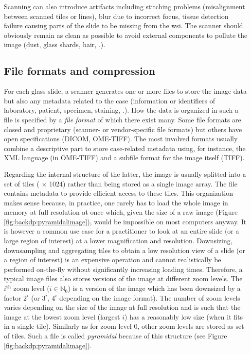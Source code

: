 Scanning can also introduce artifacts including stitching problems (\ie misalignment between scanned tiles or lines), blur due to incorrect focus, tissue detection failure causing parts of the slide to be missing from the \acrshort{wsi}. The scanner should obviously remain as clean as possible to avoid external components to pollute the image (\eg dust, glass shards, hair, \etc.). 

\subsection{File formats and compression}
\label{ssec:backdp:storingviewing}

For each glass slide, a scanner generates one or more files to store the image data but also any metadata related to the case (information or identifiers of laboratory, patient, specimen, staining, \etc.). How the data is organized in such a file is specified by a \textit{file format} of which there exist many. Some file formats are closed and proprietary (\eg scanner- or vendor-specific file formats) but others have open specifications (\eg DICOM, OME-TIFF). The most involved formats usually combine a descriptive part to store case-related metadata using, for instance, the XML language (\eg in OME-TIFF) and a subfile format for the image itself (\eg TIFF). 

Regarding the internal structure of the latter, the image is usually splitted into a set of tiles ( $\times$ 1024) rather than being stored as a single image array. The file contains metadata to provide efficient access to these tiles. This organization makes sense because, in practice, one rarely has to load the whole image in memory at full resolution at once which, given the size of a raw image (\eg Figure \ref{fig:backdp:pyramidalimage}), would be impossible on most computers anyway. It is however a common use case for a practitioner to look at an entire slide (or a large region of interest) at a lower magnification and resolution. Downsizing, downsampling and aggregating tiles to obtain a low resolution view of a slide (or a region of interest) is an expensive operation and cannot realistically be performed on-the-fly without significantly increasing loading times. Therefore, a typical image files also stores versions of the image at different zoom levels. The $i^{\text{th}}$ zoom level ($i \in \mathbb{N}_0$) is a version of the image which has been downsized by a factor $2^i$ (or $3^i$, $4^i$ depending on the image format). The number of zoom levels varies depending on the size of the image at full resolution and is such that the image at the lowest zoom level (\ie largest $i$) has a reasonably low size (\eg when it fits in a single tile). Similarly as for zoom level 0, other zoom levels are stored as set of tiles. Such a file is called \textit{pyramidal} because of this structure (see Figure \ref{fig:backdp:pyramidalimage}).


